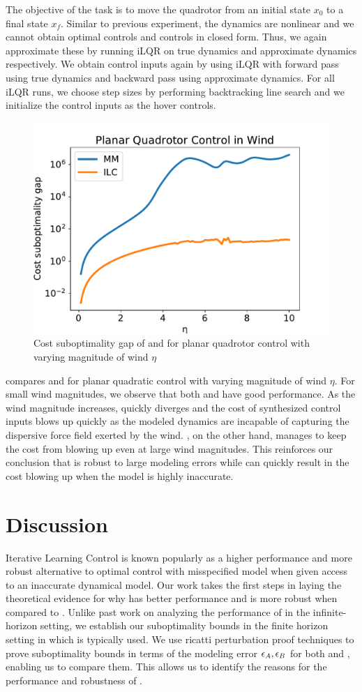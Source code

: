 The objective of the task is to move the quadrotor from an initial
state $x_0$
to a final state $x_f$. Similar to
previous experiment, the dynamics are nonlinear and we cannot obtain optimal
controls and
\MM{} controls in closed form. Thus, we again approximate these by running
iLQR on true dynamics and approximate dynamics respectively. We obtain \ILC{}
control inputs again by using iLQR with forward pass using true dynamics and
backward pass using approximate dynamics.
For all iLQR runs, we choose step sizes by performing backtracking line search
and we initialize the control inputs as the hover controls.
\begin{figure}[t]
  \centering
  \includegraphics[width=.5\linewidth]{figures/ilc/quadrotor.pdf}
  \caption{Cost suboptimality gap of \MM{} and \ILC{} for planar quadrotor control
    with varying magnitude of wind $\eta$}
  \label{fig:quadrotor}
\end{figure}
 compares \MM{} and \ILC{} for planar quadratic control with
varying magnitude of wind $\eta$. For small wind magnitudes, we
observe that both \MM{} and \ILC{} have good performance. As the wind
magnitude increases, \MM{} quickly diverges and the cost of synthesized
control inputs blows up quickly as the modeled dynamics are incapable
of capturing the dispersive force field exerted by the wind. \ILC{}, on
the other hand, manages to keep the cost from blowing up even at large
wind magnitudes. This reinforces our conclusion that \ILC{} is robust to
large modeling errors while \MM{} can quickly result in the cost blowing
up when the model is highly inaccurate.

\section{Discussion}
\label{sec:discussion}

Iterative Learning Control is known popularly as a higher
performance and more robust
alternative to optimal control with misspecified model when given access to an
inaccurate dynamical model. Our work takes the first steps in laying
the theoretical evidence for why \ILC{} has better performance and is
more robust when compared to
\MM{}. Unlike past work on analyzing the performance of \MM{} in the
infinite-horizon setting, we establish our suboptimality bounds in the
finite horizon setting in which \ILC{} is typically used. We use ricatti perturbation
proof techniques to prove suboptimality bounds in terms of the
modeling error $\epsilon_A, \epsilon_B$ for both \ILC{} and \MM{},
enabling us to compare them. This allows us to identify the reasons for the
performance and robustness of \ILC{}.

